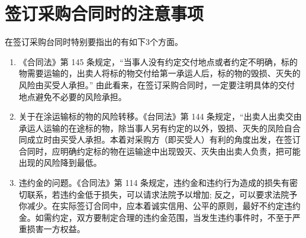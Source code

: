 \section {签订采购合同时的注意事项}

    在签订采购台同时特别要指出的有如下3个方面。

    \begin{enumerate}
        \item 《合同法》第 145 条规定，“当事人没有约定交付地点或者约定不明确，标的物需要运输的，出卖人将标的物交付给第一承运人后，标的物的毁损、灭失的风险由买受人承担。” 由此看来，在签订采购合同时，一定要注明具体的交付地点避免不必要的风险承担。

        \item 关于在涂运输标的物的风险转移。《台同法》第 144 条规定，“出卖人出卖交由承运人运输的在途标的物，除当事人另有约定的以外，毁损、灭失的凤险自合同成立时由买受人承担。本着对采购方（即买受人）有利的角度出发，在签订合同时，应明确约定标的物在运输途中出现毁灭、灭失由出卖人负责，把可能出现的风险降到最低。

        \item 违约金的问题。《合同法》第 114 条规定，违约金和违约行为造成的损失有密切联系，若违约金低于损失，可以请求法院予以增加; 反之，可以要求法院予你减少。在实际签订合同中，应本着诚实信用、公平的原则，最好不约定违约金。如需约定，双方要制定合理的违约金范围，当发生违约事件时，不至于严重损害一方权益。
   \end{enumerate}
